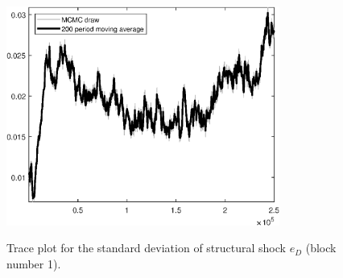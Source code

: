 \begin{figure}[H]
\centering
  \includegraphics[width=0.8\textwidth]{BRS_aggregate/graphs/TracePlot_SE_e_D_blck_1}\\
    \caption{Trace plot for the standard deviation of structural shock ${e_D}$ (block number 1).}
\end{figure}
